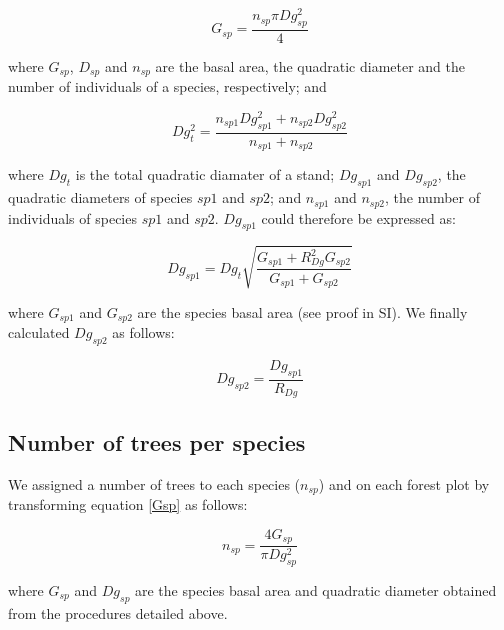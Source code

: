 \documentclass[a4paper]{article}
\begin{document}
\begin{enumerate}
  \begin{equation}\label{Gsp}
    G_{sp} = \frac{n_{sp}\pi Dg_{sp}^2}{4}
  \end{equation}

  where $G_{sp}$, $D_{sp}$ and $n_{sp}$ are the basal area, the quadratic diameter and the number of individuals of a species, respectively; and

  \begin{equation}\label{}
    Dg_t^2 = \frac{n_{sp1}Dg_{sp1}^2 + n_{sp2}Dg_{sp2}^2}{n_{sp1} + n_{sp2}}
  \end{equation}

  where $Dg_t$ is the total quadratic diamater of a stand; $Dg_{sp1}$ and $Dg_{sp2}$, the quadratic diameters of species $sp1$ and $sp2$; and $n_{sp1}$ and $n_{sp2}$, the number of individuals of species $sp1$ and $sp2$. $Dg_{sp1}$ could therefore be expressed as:

  \begin{equation}\label{}
    Dg_{sp1} = Dg_t\sqrt{\frac{G_{sp1} + R_{Dg}^2G_{sp2}}{G_{sp1} + G_{sp2}}}
  \end{equation}

  where $G_{sp1}$ and $G_{sp2}$ are the species basal area (see proof in SI). We finally calculated $Dg_{sp2}$ as follows:

  \begin{equation}\label{}
    Dg_{sp2} = \frac{Dg_{sp1}}{R_{Dg}}
  \end{equation}

\end{enumerate}


\subsection*{Number of trees per species}

\noindent We assigned a number of trees to each species ($n_{sp}$) and on each forest plot by transforming equation \ref{Gsp} as follows:

\begin{equation}\label{}
  n_{sp} = \frac{4G_{sp}}{\pi Dg_{sp}^2}
\end{equation}

\noindent where $G_{sp}$ and $Dg_{sp}$ are the species basal area and quadratic diameter obtained from the procedures detailed above.

\end{document}
